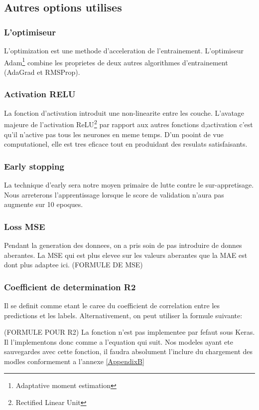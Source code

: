 \subsection{Autres options utilises}

\subsubsection{L'optimiseur}
L'optimization est une methode d'acceleration de l'entrainement. L'optimiseur Adam\footnote{Adaptative moment estimation} combine les proprietes de deux autres algorithmes d'entrainement (AdaGrad et RMSProp).

\subsubsection{Activation RELU}
La fonction d'activation introduit une non-linearite entre les couche. L'avatage majeure de l'activation ReLU\footnote{Rectified Linear Unit} par rapport aux autres fonctions d;activation c'est qu'il n'active pas tous les neurones en meme temps. D'un pooint de vue computationel, elle est tres eficace tout en produidant des resulats satisfaisants.

\subsubsection{Early stopping}

La technique d'early sera notre moyen primaire de lutte contre le sur-appretisage. Nous arreterons l'apprentissage lorsque le score de validation n'aura pas augmente sur 10 epoques.

\subsubsection{Loss MSE}
Pendant la generation des donnees, on a pris soin de pas introduire de donnes aberantes. La MSE qui est plus elevee sur les valeurs aberantes que la MAE est dont plus adaptee ici.
(FORMULE DE MSE)

\subsubsection{Coefficient de determination R2}
Il se definit comme etant le caree du coefficient de correlation entre les predictions et les labels. Alternativement, on peut utiliser la formule suivante:

(FORMULE POUR R2)
La fonction n'est pas implementee par fefaut sous Keras. Il l'implementons donc comme a l'equation qui suit. Nos modeles ayant ete sauvegardes avec cette fonction, il faudra absolument l'inclure du chargement des modles conformement a l'annexe \ref{AppendixB}

